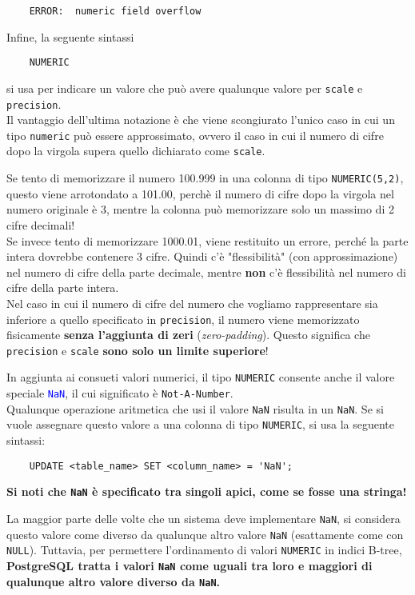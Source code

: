 \documentclass[12pt,a4paper]{book}
\begin{document}
	\begin{lstlisting}
	ERROR:  numeric field overflow
	\end{lstlisting}
	Infine, la seguente sintassi
	\begin{lstlisting}
	NUMERIC
	\end{lstlisting}
	si usa per indicare un valore che può avere qualunque valore per \texttt{scale} e \texttt{precision}.\\
	Il vantaggio dell'ultima notazione è che viene scongiurato l'unico caso in cui un tipo \texttt{numeric} può essere approssimato, ovvero il caso in cui il numero di cifre dopo la virgola supera quello dichiarato come \texttt{scale}.\\ 
	\begin{tcolorbox}[enhanced jigsaw, breakable,title=Esempio, title filled]
		Se tento di memorizzare il numero 100.999 in una colonna di tipo \texttt{NUMERIC(5,2)}, questo viene arrotondato a 101.00, perchè il numero di cifre dopo la virgola nel numero originale è 3, mentre la colonna può memorizzare solo un massimo di 2 cifre decimali!\\
		Se invece tento di memorizzare 1000.01, viene restituito un errore, perché la parte intera dovrebbe contenere 3 cifre. Quindi c'è "flessibilità" (con approssimazione) nel numero di cifre della parte decimale, mentre \textbf{non} c'è flessibilità nel numero di cifre della parte intera.\\
		Nel caso in cui il numero di cifre del numero che vogliamo rappresentare sia inferiore a quello specificato in \texttt{precision}, il numero viene memorizzato fisicamente \textbf{senza l'aggiunta di zeri} (\textit{zero-padding}). Questo significa che \texttt{precision} e \texttt{scale} \textbf{sono solo un limite superiore}!
	\end{tcolorbox}
	In aggiunta ai consueti valori numerici, il tipo \texttt{NUMERIC} consente anche il valore speciale \textcolor{blue}{\texttt{NaN}}, il cui significato è \texttt{Not-A-Number}.\\Qualunque operazione aritmetica che usi il valore \texttt{NaN} risulta in un \texttt{NaN}. Se si vuole assegnare questo valore a una colonna di tipo \texttt{NUMERIC}, si usa la seguente sintassi:
	\begin{lstlisting}
	UPDATE <table_name> SET <column_name> = 'NaN';
	\end{lstlisting}
	\textbf{Si noti che \texttt{NaN} è specificato tra singoli apici, come se fosse una stringa!}
	\begin{tcolorbox}[enhanced jigsaw, breakable, title=Attenzione, colframe=red!70!black]
	La maggior parte delle volte che un sistema deve implementare \texttt{NaN}, si considera questo valore come diverso da qualunque altro valore \texttt{NaN} (esattamente come con \texttt{NULL}).
	Tuttavia, per permettere l'ordinamento di valori \texttt{NUMERIC} in indici B-tree, \textbf{PostgreSQL tratta i valori \texttt{NaN} come uguali tra loro e maggiori di qualunque altro valore diverso da \texttt{NaN}.}
	\end{tcolorbox}
\end{document}
